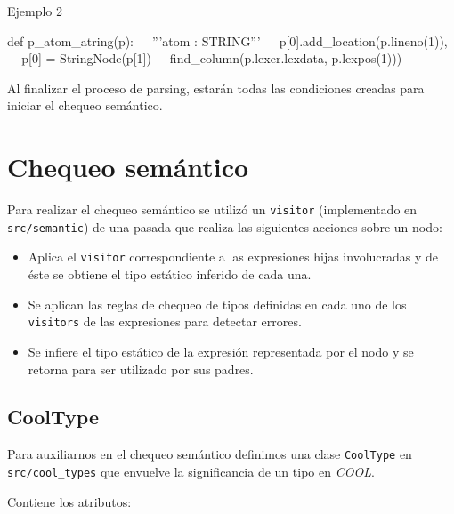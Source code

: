 \documentclass[a4paper,10pt,twocolumn]{article}
\begin{document}
\begin{algorithm}
	\caption{Ejemplo 2}
	\begin{algorithmic}
		\STATE def p\_atom\_atring(p):
		\STATE $\;\;\; $ '''atom : STRING'''
		\STATE $\;\;\; $ p[0].add\_location(p.lineno(1)),
		\STATE $\;\;\; $ p[0] = StringNode(p[1])
		\STATE $\;\;\; $ find\_column(p.lexer.lexdata, p.lexpos(1)))
	\end{algorithmic}
\end{algorithm}

Al finalizar el proceso de parsing, estarán todas las condiciones creadas para iniciar el chequeo semántico.

\section{Chequeo semántico}

Para realizar el chequeo semántico se utilizó un \lstinline|visitor| (implementado en \lstinline|src/semantic|) de una pasada que realiza las siguientes acciones sobre un nodo:

\begin{itemize}
	\item Aplica el \lstinline|visitor| correspondiente a las expresiones hijas involucradas y de éste se obtiene el tipo estático inferido de cada una. 
	\item Se aplican las reglas de chequeo de tipos definidas en cada uno de los \lstinline|visitors| de las expresiones para detectar errores. 
	\item Se infiere el tipo estático de la expresión representada por el nodo y se retorna para ser utilizado por sus padres. 
\end{itemize}

\subsection{CoolType}
Para auxiliarnos en el chequeo semántico definimos una clase \lstinline|CoolType| en \lstinline|src/cool_types| que envuelve la significancia de un tipo en \textit{COOL}. 

Contiene los atributos:
\end{document}
